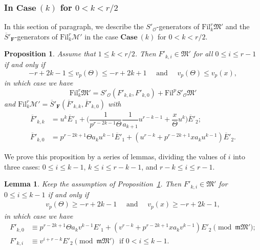\documentclass[11pt]{amsart}
\theoremstyle{definition}
\numberwithin{equation}{subsection}
\theoremstyle{plain}
\theoremstyle{plain}
\theoremstyle{plain}
\theoremstyle{plain}
\theoremstyle{plain}
\theoremstyle{plain}
\theoremstyle{plain}
\theoremstyle{plain}
\newtheorem{prop}[equation]{Proposition}
\theoremstyle{plain}
\newtheorem{lemm}[equation]{Lemma}
\theoremstyle{plain}
\theoremstyle{plain}
\theoremstyle{plain}
\theoremstyle{definition}
\theoremstyle{definition}
\theoremstyle{definition}
\theoremstyle{remark}
\renewcommand{\(}{\textup{(}}
\renewcommand{\)}{\textup{)}}
\newcommand{\F}{\mathbf{F}}
\newcommand{\barS}{\overline{S}}
\newcommand{\cM}{\mathcal{M}}
\newcommand{\fM}{\mathfrak{M}}
\newcommand{\fm}{\mathfrak{m}}
\newcommand{\Fil}{\mathrm{Fil}}
\newcommand{\cO}{\mathcal{O}}
\newcommand{\barE}{\overline{E}}
\newcommand{\barF}{\overline{F}}
\begin{document}
\subsubsection{\textbf{In $\mathbf{Case}~(k)$ for $0< k<r/2$}}
In this section of paragraph, we describe the $S'_\cO$-generators of $\Fil^r_{k}\fM'$ and the $\barS'_\F$-generators of $\Fil^r_{k}\cM'$ in the case $\mathbf{Case}~(k)$ for $0< k<r/2$.


\begin{prop}\label{prop: Fil-Case-1-r/2}
Assume that $1\leq k<r/2$. Then $F'_{k,i}\in\fM'$ for all $0\leq i\leq r-1$ if and only if
\begin{equation}\label{eq: condition for 1 leq k <r/2}
-r+2k-1\leq v_p(\Theta)\leq -r+2k+1 \quad\mbox{ and }\quad v_p(\Theta)\leq v_p(x),
\end{equation}
in which case we have $$\Fil^r_{k}\fM'=S'_\cO(F'_{k,k},F'_{k,0})+\Fil^p S'_\cO\fM'$$ and $\Fil^r_{k}\cM'=\barS'_\F(\barF'_{k,k},\barF'_{k,0})$ with
    \begin{align*}
    \barF'_{k,k}&=u^k\barE'_1  +\bigg(\dfrac{1}{p^{r-2k-1}\Theta}\dfrac{1}{a_{k+1}}u^{r-k-1}+\dfrac{x}{\Theta}u^k\bigg)\barE'_2;    \\
    \barF'_{k,0}&=p^{r-2k+1}\Theta a_ku^{k-1}\barE'_1 +(u^{r-k}+p^{r-2k+1}xa_ku^{k-1})\barE'_2.
    \end{align*}
\end{prop}



We prove this proposition by a series of lemmas, dividing the values of $i$ into three cases: $0\leq i\leq k-1$, $k\leq i\leq r-k-1$, and $r-k\leq i\leq r-1$.
\begin{lemm}\label{lemma 0 < k <r/2. 0 leq i leq k-1}
Keep the assumption of Proposition~\ref{prop: Fil-Case-1-r/2}. Then $F'_{k,i}\in\fM'$ for $0\leq i\leq k-1$ if and only if
\begin{align*}
    v_p(\Theta)\geq -r+2k-1
    \quad\mbox{ and }\quad
    v_p(x)\geq -r+2k-1,
\end{align*}
in which case we have
\begin{align*}
F'_{k,0}
    &\equiv
    p^{r-2k+1}\Theta a_kv^{k-1}E'_1
    +(v^{r-k}+p^{r-2k+1}xa_kv^{k-1})E'_2
    \pmod{\fm\fM'};
    \\
F'_{k,i}
    &\equiv
    v^{i+r-k}E'_2
    \pmod{\fm\fM'}\,\,\mbox{ if }0<i\leq k-1.
\end{align*}
\end{lemm}
\end{document}
